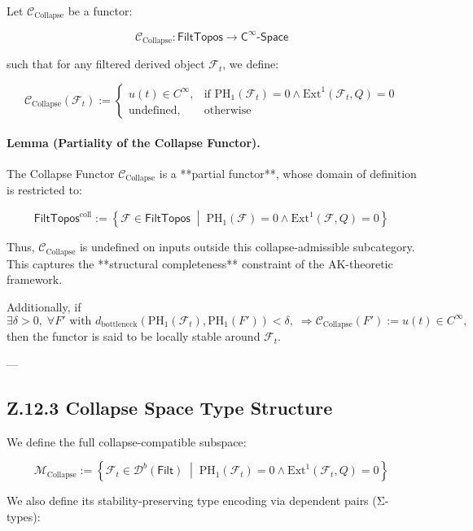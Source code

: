 \documentclass[11pt]{article}
\begin{document}
\begin{axiom}
\begin{axiom}
{{Let \( \mathcal{C}_{\text{Collapse}} \) be a functor:

\[
\mathcal{C}_{\text{Collapse}} : \mathsf{FiltTopos} \to \mathsf{C^\infty\text{-}Space}
\]

such that for any filtered derived object \( \mathcal{F}_t \), we define:

\[
\mathcal{C}_{\text{Collapse}}(\mathcal{F}_t) :=
\begin{cases}
  u(t) \in C^\infty, & \text{if } \mathrm{PH}_1(\mathcal{F}_t) = 0 \land \mathrm{Ext}^1(\mathcal{F}_t, Q) = 0 \\
  \text{undefined}, & \text{otherwise}
\end{cases}
\]

\paragraph{Lemma (Partiality of the Collapse Functor).}

The Collapse Functor \( \mathcal{C}_{\text{Collapse}} \) is a **partial functor**,  
whose domain of definition is restricted to:

\[
\mathsf{FiltTopos}^{\text{coll}} := \left\{ \mathcal{F} \in \mathsf{FiltTopos} \;\middle|\; \mathrm{PH}_1(\mathcal{F}) = 0 \land \mathrm{Ext}^1(\mathcal{F}, Q) = 0 \right\}
\]

Thus, \( \mathcal{C}_{\text{Collapse}} \) is undefined on inputs outside this collapse-admissible subcategory.  
This captures the **structural completeness** constraint of the AK-theoretic framework.

Additionally, if
\[
\exists \delta > 0,\; \forall F' \text{ with } d_{\text{bottleneck}}(\mathrm{PH}_1(\mathcal{F}_t), \mathrm{PH}_1(F')) < \delta,\;
\Rightarrow \mathcal{C}_{\text{Collapse}}(F') := u(t) \in C^\infty,
\]
then the functor is said to be locally stable around \( \mathcal{F}_t \).

---

\subsection*{Z.12.3 Collapse Space Type Structure}

We define the full collapse-compatible subspace:

\[
\mathcal{M}_{\text{Collapse}} := \left\{ \mathcal{F}_t \in \mathcal{D}^b(\mathsf{Filt}) \;\middle|\; \mathrm{PH}_1(\mathcal{F}_t) = 0 \land \mathrm{Ext}^1(\mathcal{F}_t, Q) = 0 \right\}
\]

We also define its stability-preserving type encoding via dependent pairs (Σ-types):

}}
\end{axiom}
\end{axiom}
\end{document}

